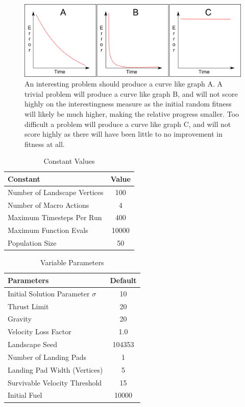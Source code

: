 \documentclass[conference]{IEEEtran}
\begin{document}
\begin{figure}[hbtp]
\centering
\includegraphics[scale=0.39]{img/improvement}
\caption{An interesting problem should produce a curve like graph A. A trivial problem will produce a curve like graph B, and will not score highly on the interestingness measure as the initial random fitness will likely be much higher, making the relative progress smaller. Too difficult a problem will produce a curve like graph C, and will not score highly as there will have been little to no improvement in fitness at all.}
\label{fig:graph_improvement}
\end{figure}


\begin{table}[ht]
\caption{Constant Values}
\label{tab:const}
\begin{tabular}{l | c}
\hline
Constant	& Value \\
\hline
Number of Landscape Vertices	& 100 \\
Number of Macro Actions	& 4 \\
Maximum Timesteps Per Run	& 400 \\
Maximum Function Evals	& 10000 \\
Population Size	& 50 \\
\hline
\end{tabular}
\end{table}

\begin{table}[ht]
\caption{Variable Parameters}
\label{tab:params}
\begin{tabular}{l | c}
\hline
Parameters & Default \\
\hline
Initial Solution Parameter $\sigma$	& 10 \\
Thrust Limit & 20 \\
Gravity	 & 20 \\
Velocity Loss Factor & 1.0 \\
Landscape Seed & 104353 \\
Number of Landing Pads	& 1 \\
Landing Pad Width (Vertices)	& 5	 \\
Survivable Velocity Threshold	& 15 \\
Initial Fuel	& 10000 \\
\hline	
\end{tabular}	
\end{table}
\end{document}
